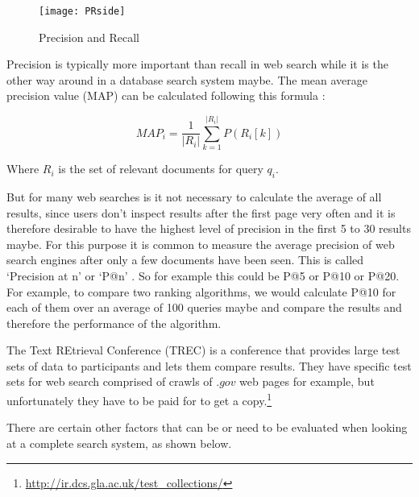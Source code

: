 %   

\begin{figure}[!htbp]
  \centering
  \texttt{[image: PRside]}
  \caption[Precision and Recall]{Precision and Recall\footnotemark}
\label{fig:PR}
\end{figure}

Precision is typically more important than recall in web search while it is the other way around in a database search system maybe. The mean average precision value (MAP) can be calculated following this formula \autocite[p.141]{Baeza-Yates2011}:

\begin{equation}
  MAP_i = \frac{1}{|R_i|} \sum_{k=1}^{|R_i|} P(R_i[k])
\label{eq:MAP}
\end{equation}

Where $R_i$ is the set of relevant documents for query $q_i$.

But for many web searches is it not necessary to calculate the average of all results, since users don't inspect results after the first page very often and it is therefore desirable to have the highest level of precision in the first 5 to 30 results maybe. For this purpose it is common to measure the average precision of web search engines after only a few documents have been seen. This is called `Precision at n' or `P@n' \autocite[p.140]{Baeza-Yates2011}. So for example this could be P@5 or P@10 or P@20. For example, to compare two ranking algorithms, we would calculate P@10 for each of them over an average of 100 queries maybe and compare the results and therefore the performance of the algorithm.

The Text REtrieval Conference (TREC) is a conference that provides large test sets of data to participants and lets them compare results. They have specific test sets for web search comprised of crawls of $.gov$ web pages for example, but unfortunately they have to be paid for to get a copy.\footnote{\url{http://ir.dcs.gla.ac.uk/test_collections/}}%

There are certain other factors that can be or need to be evaluated when looking at a complete search system, as shown below.

